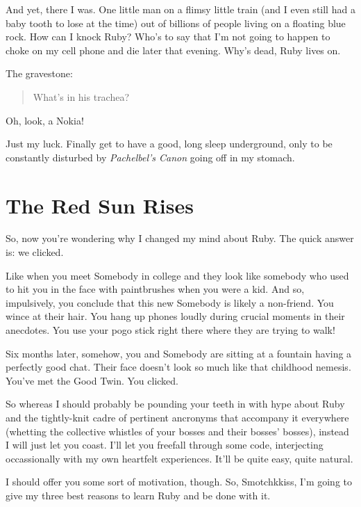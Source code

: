 \documentclass[10pt,twoside]{report}
\begin{document}
And yet, there I was.  One little man on a flimsy little train (and I
even still had a baby tooth to lose at the time) out of billions of
people living on a floating blue rock.  How can I knock Ruby?  Who's
to say that I'm not going to happen to choke on my cell phone and die
later that evening.  Why's dead, Ruby lives on.

The gravestone:

\begin{quote}
What's in his trachea?\end{quote}

Oh, look, a Nokia!

Just my luck.  Finally get to have a good, long sleep underground,
only to be constantly disturbed by {\em Pachelbel's Canon} going off
in my stomach.


\section{The Red Sun Rises}


So, now you're wondering why I changed my mind about Ruby.  The quick
answer is: we clicked.

Like when you meet Somebody in college and they look like somebody who
used to hit you in the face with paintbrushes when you were a kid.
And so, impulsively, you conclude that this new Somebody is likely a
non-friend.  You wince at their hair.  You hang up phones loudly
during crucial moments in their anecdotes.  You use your pogo stick
right there where they are trying to walk!

Six months later, somehow, you and Somebody are sitting at a fountain
having a perfectly good chat.  Their face doesn't look so much like
that childhood nemesis.  You've met the Good Twin.  You clicked.

So whereas I should probably be pounding your teeth in with hype about
Ruby and the tightly-knit cadre of pertinent ancronyms that accompany
it everywhere (whetting the collective whistles of your bosses and
their bosses' bosses), instead I will just let you coast.  I'll let
you freefall through some code, interjecting occassionally with my own
heartfelt experiences.  It'll be quite easy, quite natural.

I should offer you some sort of motivation, though.  So, Smotchkkiss,
I'm going to give my three best reasons to learn Ruby and be done with
it.
\end{document}
